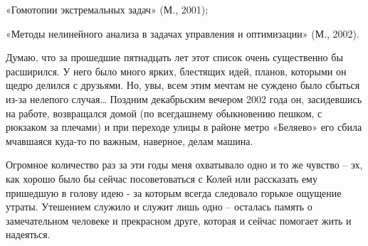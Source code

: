 «Гомотопии экстремальных задач» (М., 2001);

«Методы нелинейного анализа в задачах управления и оптимизации» (М., 2002).

	Думаю, что за прошедшие пятнадцать лет этот список очень существенно бы расширился. У него было много ярких, блестящих идей, планов, которыми он щедро делился с друзьями. Но, увы, всем  этим мечтам не суждено было сбыться из-за нелепого случая… Поздним декабрьским вечером 2002 года он, засидевшись на работе, возвращался домой (по всегдашнему обыкновению пешком, с рюкзаком за плечами) и при переходе улицы в районе метро «Беляево» его сбила мчавшаяся куда-то по важным, наверное, делам машина.

Огромное количество раз за эти годы меня охватывало одно и то же чувство – эх, как хорошо было бы сейчас посоветоваться с Колей или рассказать ему пришедшую в голову идею - за которым всегда следовало горькое ощущение утраты. Утешением служило и служит лишь одно – осталась память о замечательном человеке и прекрасном друге, которая и сейчас помогает жить и надеяться.
